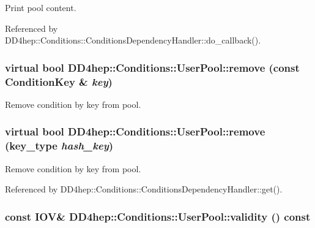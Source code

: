 Print pool content. 

Referenced by DD4hep::Conditions::ConditionsDependencyHandler::do\_\-callback().\hypertarget{class_d_d4hep_1_1_conditions_1_1_user_pool_ac8f9ef22b7ec455e7ab56d05dc43af77}{
\subsubsection[{remove}]{\setlength{\rightskip}{0pt plus 5cm}virtual bool DD4hep::Conditions::UserPool::remove (const {\bf ConditionKey} \& {\em key})}}
\label{class_d_d4hep_1_1_conditions_1_1_user_pool_ac8f9ef22b7ec455e7ab56d05dc43af77}


Remove condition by key from pool. \hypertarget{class_d_d4hep_1_1_conditions_1_1_user_pool_aeab574005dcfb99f8147b87d220f65f1}{
\subsubsection[{remove}]{\setlength{\rightskip}{0pt plus 5cm}virtual bool DD4hep::Conditions::UserPool::remove ({\bf key\_\-type} {\em hash\_\-key})}}
\label{class_d_d4hep_1_1_conditions_1_1_user_pool_aeab574005dcfb99f8147b87d220f65f1}


Remove condition by key from pool. 

Referenced by DD4hep::Conditions::ConditionsDependencyHandler::get().\hypertarget{class_d_d4hep_1_1_conditions_1_1_user_pool_a2f7e5862cd4de0fee5a0a5d1283e2ccf}{
\subsubsection[{validity}]{\setlength{\rightskip}{0pt plus 5cm}const {\bf IOV}\& DD4hep::Conditions::UserPool::validity () const}}
\label{class_d_d4hep_1_1_conditions_1_1_user_pool_a2f7e5862cd4de0fee5a0a5d1283e2ccf}



